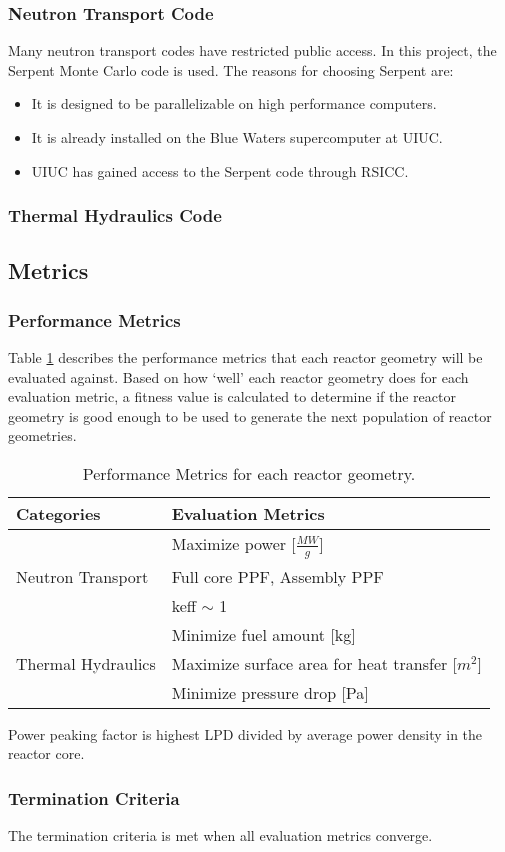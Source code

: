 \subsubsection{Neutron Transport Code}
Many neutron transport codes have restricted public access. 
In this project, the Serpent Monte Carlo code is used. 
The reasons for choosing Serpent are: 
\begin{itemize}
    \item It is designed to be parallelizable on high performance 
    computers. 
    \item It is already installed on the Blue Waters supercomputer at UIUC. 
    \item UIUC has gained access to the Serpent code through RSICC. 
\end{itemize}

\subsubsection{Thermal Hydraulics Code}

\subsection{Metrics}

\subsubsection{Performance Metrics}
Table \ref{tab:eval-metric} describes the performance metrics that each 
reactor geometry will be evaluated against. 
Based on how `well' each reactor geometry does for each evaluation metric, 
a fitness value is calculated to determine if the reactor geometry is good 
enough to be used to generate the next population of reactor geometries. 

\begin{table}[!htbp]
    \caption{Performance Metrics for each reactor geometry.}
    \label{tab:eval-metric}
    \centering
    \doublespacing
    \small
    \begin{tabular}{ll}
    \hline
    \textbf{Categories} & \textbf{Evaluation Metrics}\\ \hline
    & Maximize power [$\frac{MW}{g}$] \\
    Neutron Transport & Full core \gls{PPF}, Assembly \gls{PPF} \\ 
    & keff $\sim$ 1 \\ 
    & Minimize fuel amount [kg] \\ \hline
    Thermal Hydraulics & Maximize surface area for heat transfer [$m^2$]\\ 
    & Minimize pressure drop [Pa]\\ \hline 
    \end{tabular}
\end{table}

Power peaking factor is highest \gls{LPD} divided by average power density in 
the reactor core. 

\subsubsection{Termination Criteria}
The termination criteria is met when all evaluation metrics converge. 
